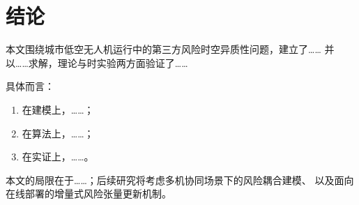 
\section{结论}
\label{sec:conclusion}

本文围绕城市低空无人机运行中的第三方风险时空异质性问题，建立了……
并以……求解，理论与时实验两方面验证了……

具体而言：
\begin{enumerate}
  \item 在建模上，……；
  \item 在算法上，……；
  \item 在实证上，……。
\end{enumerate}

本文的局限在于……；后续研究将考虑多机协同场景下的风险耦合建模、
以及面向在线部署的增量式风险张量更新机制。

